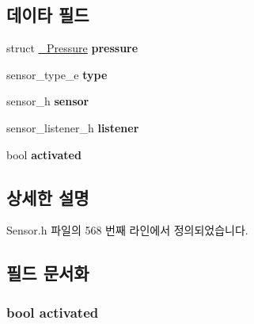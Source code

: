 \subsection*{데이타 필드}
\begin{DoxyCompactItemize}
\item 
\hypertarget{struct__PressureExtend_a9dba4e614ab2adf5a3ffa8d5bb899412}{struct \hyperlink{struct__Pressure}{\-\_\-\-Pressure} {\bfseries pressure}}\label{struct__PressureExtend_a9dba4e614ab2adf5a3ffa8d5bb899412}

\item 
\hypertarget{struct__PressureExtend_abffb09766da2fc510a79bb51f82a36e1}{sensor\-\_\-type\-\_\-e {\bfseries type}}\label{struct__PressureExtend_abffb09766da2fc510a79bb51f82a36e1}

\item 
\hypertarget{struct__PressureExtend_a5bae9b7801bc3808411925cde81d3f26}{sensor\-\_\-h {\bfseries sensor}}\label{struct__PressureExtend_a5bae9b7801bc3808411925cde81d3f26}

\item 
\hypertarget{struct__PressureExtend_aa977dfb866b24fd7d9a20a9a01b2fd1f}{sensor\-\_\-listener\-\_\-h {\bfseries listener}}\label{struct__PressureExtend_aa977dfb866b24fd7d9a20a9a01b2fd1f}

\item 
\hypertarget{struct__PressureExtend_a73e9fa0c3543560192f38a8ab6a78c47}{bool {\bfseries activated}}\label{struct__PressureExtend_a73e9fa0c3543560192f38a8ab6a78c47}

\end{DoxyCompactItemize}


\subsection{상세한 설명}


Sensor.\-h 파일의 568 번째 라인에서 정의되었습니다.



\subsection{필드 문서화}
\hypertarget{struct__PressureExtend_a73e9fa0c3543560192f38a8ab6a78c47}{
\subsubsection[{activated}]{\setlength{\rightskip}{0pt plus 5cm}bool activated}}\label{struct__PressureExtend_a73e9fa0c3543560192f38a8ab6a78c47}


